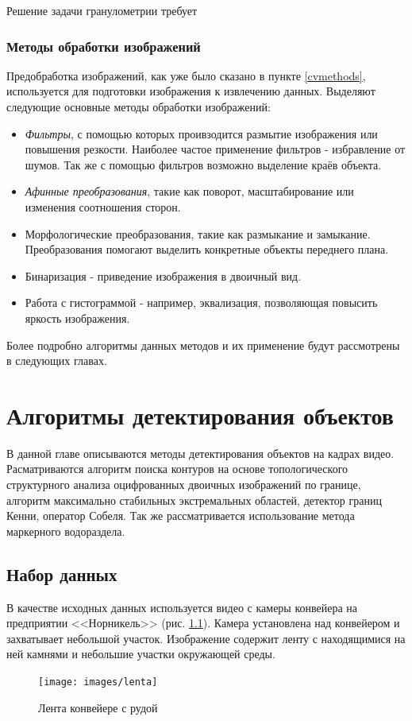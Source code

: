 \documentclass[specification,annotation,times]{itmo-student-thesis}
\begin{document}
Решение задачи гранулометрии требует 
\subsection{Методы обработки изображений}
Предобработка изображений, как уже было сказано в пункте \ref{cvmethods}, используется для подготовки изображения к извлечению данных.
Выделяют следующие основные методы обработки изображений:

\begin{itemize}
	\item \textit{Фильтры}, с помощью которых проивзодится размытие изображения или повышения резкости. Наиболее частое применение фильтров - избравление от шумов.  Так же с помощью фильтров возможно выделение краёв объекта. 
	\item \textit{Афинные преобразования}, такие как поворот, масштабирование или изменения соотношения сторон.
	\item Морфологические преобразования, такие как размыкание и замыкание. Преобразования помогают выделить конкретные объекты переднего плана.
	\item Бинаризация - приведение изображения в двоичный вид.
	\item Работа с гистограммой - например, эквализация, позволяющая повысить яркость изображения.
\end{itemize}
Более подробно алгоритмы данных методов и их применение будут рассмотрены в следующих главах.

\chapterconclusion


\chapter{Алгоритмы детектирования объектов}
В данной главе описываются методы детектирования объектов на кадрах видео. Расматриваются
алгоритм поиска контуров на основе топологического структурного анализа оцифрованных двоичных изображений по границе, алгоритм максимально стабильных экстремальных областей, детектор границ Кенни, оператор Собеля. Так же рассматривается использование метода маркерного водораздела. 

\section{Набор данных}
В качестве исходных данных используется видео с камеры конвейера на предприятии <<Норникель>> (рис. \ref{fig:lenta}). Камера установлена над конвейером и захватывает небольшой участок. 
Изображение содержит ленту с находящимися на ней камнями и небольшие участки окружающей среды.
\begin{figure}[h!]
	\centering
	\texttt{[image: images/lenta]}
	\caption{Лента конвейере с рудой}
	\label{fig:lenta}
\end{figure}
\end{document}
